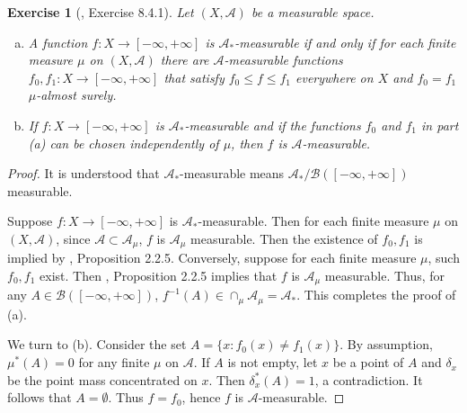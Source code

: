 \documentclass[11pt]{article}
\theoremstyle{plain}
\newtheorem{exercise}{Exercise}
\theoremstyle{definition}
\theoremstyle{remark}
\begin{document}
\begin{exercise}[\cite{book:992991}, Exercise 8.4.1]
    Let $(X,\mathscr A)$ be a measurable space. 
    \begin{enumerate}[(a)]
        \item 
            A function $f: X\to [-\infty, + \infty]$ is $\mathscr A_*$-measurable if and only if for each finite measure $\mu$ on $ (X, \mathscr A)$ there are $\mathscr A $-measurable functions $f_0, f_1: X\to [-\infty, + \infty]$ that satisfy $f_0 \leq f \leq f_1$ everywhere on $X$ and $f_0=f_1$ $\mu$-almost surely.
        \item
            If $f: X\to [-\infty, + \infty]$ is $ \mathscr A_*$-measurable and if the functions $f_0$ and $f_1$ in part (a) can be chosen independently of $\mu$, then $f$ is $\mathscr A$-measurable.
    \end{enumerate}
\end{exercise}
\begin{proof}
    It is understood that $\mathscr A_*$-measurable means $\mathscr A_*/ \mathscr B([-\infty, +\infty])$ measurable.

    Suppose $f: X\to [-\infty, + \infty]$ is $\mathscr A_*$-measurable.
    Then for each finite measure $\mu$ on $(X, \mathscr A)$, since $\mathscr A \subset \mathscr A_\mu$, $f$ is $\mathscr A_\mu$ measurable.
    Then the existence of $f_0, f_1$ is implied by \cite{book:992991}, Proposition 2.2.5.
    Conversely, suppose for each finite measure $\mu$, such $f_0,f_1$ exist.
    Then \cite{book:992991}, Proposition 2.2.5 implies that $f$ is $\mathscr A_\mu$ measurable.
    Thus, for any $A \in \mathscr B ([-\infty, + \infty])$, $f^{-1}(A) \in \cap_{\mu} \mathscr A_\mu  = \mathscr A_*$.
    This completes the proof of (a).

    We turn to (b).
    Consider the set $A=\{x: f_0(x) \neq f_1(x)\}$.
    By assumption, $\mu^*(A)=0$ for any finite $\mu$ on $\mathscr A$.
    If $A$ is not empty, let $x$ be a point of $A$ and $\delta_x$ be the point mass concentrated on $x$.
    Then $\delta_x^* (A)=1$, a contradiction.
    It follows that $A= \emptyset$.
    Thus $f=f_0$, hence $f$ is $\mathscr A$-measurable.
\end{proof}




\end{document}
